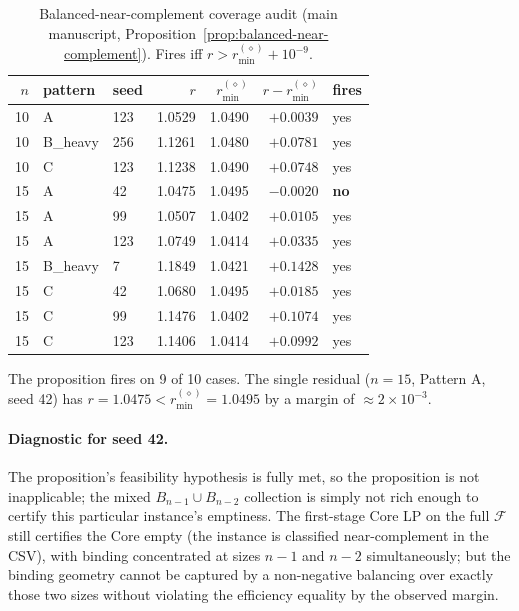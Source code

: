 \documentclass[11pt]{article}
\theoremstyle{plain}
\theoremstyle{definition}
\theoremstyle{remark}
\begin{document}
\begin{table}[htbp]
\centering
\footnotesize
\caption{Balanced-near-complement coverage audit (main manuscript, Proposition~\ref{prop:balanced-near-complement}). Fires iff $r>r^{(\diamond)}_{\min}+10^{-9}$.}
\label{tab:bnc-coverage}
\begin{tabular}{@{}rllrrrl@{}}
\toprule
$n$ & pattern & seed & $r$ & $r^{(\diamond)}_{\min}$ & $r - r^{(\diamond)}_{\min}$ & fires \\
\midrule
10 & A        & 123 & 1.0529 & 1.0490 & $+0.0039$ & yes \\
10 & B\_heavy & 256 & 1.1261 & 1.0480 & $+0.0781$ & yes \\
10 & C        & 123 & 1.1238 & 1.0490 & $+0.0748$ & yes \\
15 & A        &  42 & 1.0475 & 1.0495 & $-0.0020$ & \textbf{no} \\
15 & A        &  99 & 1.0507 & 1.0402 & $+0.0105$ & yes \\
15 & A        & 123 & 1.0749 & 1.0414 & $+0.0335$ & yes \\
15 & B\_heavy &   7 & 1.1849 & 1.0421 & $+0.1428$ & yes \\
15 & C        &  42 & 1.0680 & 1.0495 & $+0.0185$ & yes \\
15 & C        &  99 & 1.1476 & 1.0402 & $+0.1074$ & yes \\
15 & C        & 123 & 1.1406 & 1.0414 & $+0.0992$ & yes \\
\bottomrule
\end{tabular}
\end{table}

The proposition fires on 9 of 10 cases. The single residual ($n=15$, Pattern A, seed 42) has $r=1.0475<r^{(\diamond)}_{\min}=1.0495$ by a margin of $\approx 2\times 10^{-3}$.

\paragraph{Diagnostic for seed 42.} The proposition's feasibility hypothesis is fully met, so the proposition is not inapplicable; the mixed $B_{n-1}\cup B_{n-2}$ collection is simply not rich enough to certify this particular instance's emptiness. The first-stage Core LP on the full $\mathcal{F}$ still certifies the Core empty (the instance is classified near-complement in the CSV), with binding concentrated at sizes $n-1$ and $n-2$ simultaneously; but the binding geometry cannot be captured by a non-negative balancing over exactly those two sizes without violating the efficiency equality by the observed margin.
\end{document}
